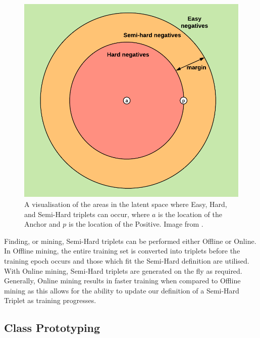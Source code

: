 \begin{figure}
	\begin{center}
		\includegraphics[scale=0.7]{Chapter5/figs/semi-hard-triplet-mining.png}
	\end{center}
	\caption{A visualisation of the areas in the latent space where Easy, Hard, and Semi-Hard triplets can occur, where $a$ is the location of the Anchor and $p$ is the location of the Positive. Image from \cite{moindrot_triplet_2018}.}
	\label{fig:semi-hard-triplet-mining}
\end{figure}

Finding, or mining, Semi-Hard triplets can be performed either Offline or Online. In Offline mining, the entire training set is converted into triplets before the training epoch occurs and those which fit the Semi-Hard definition are utilised. With Online mining, Semi-Hard triplets are generated on the fly as required. Generally, Online mining results in faster training when compared to Offline mining as this allows for the ability to update our definition of a Semi-Hard Triplet as training progresses.

\subsection{Class Prototyping}\label{ch:ID,sec:SNNBackground,sub:prototypes}

